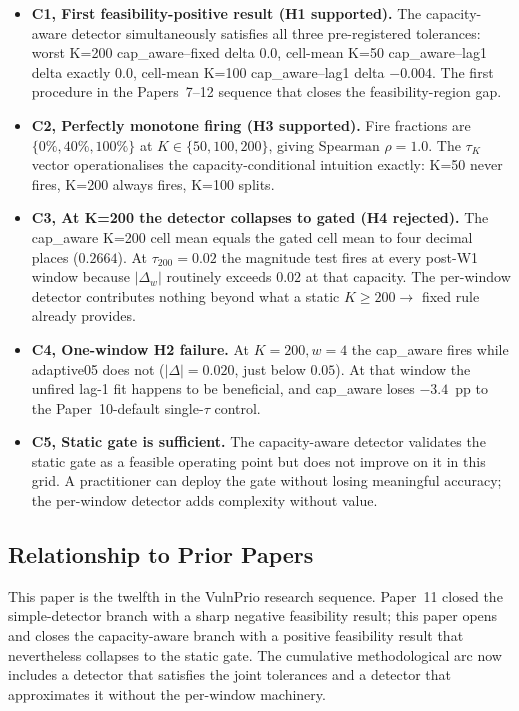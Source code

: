 \begin{itemize}
\item \textbf{C1, First feasibility-positive result (H1 supported).}
The capacity-aware detector simultaneously satisfies all three
pre-registered tolerances: worst K=200 cap\_aware--fixed delta $0.0$,
cell-mean K=50 cap\_aware--lag1 delta exactly $0.0$, cell-mean K=100
cap\_aware--lag1 delta $-0.004$. The first procedure in the
Papers~7--12 sequence that closes the feasibility-region gap.

\item \textbf{C2, Perfectly monotone firing (H3 supported).} Fire
fractions are $\{0\%, 40\%, 100\%\}$ at $K \in \{50, 100, 200\}$,
giving Spearman $\rho = 1.0$. The $\tau_K$ vector operationalises
the capacity-conditional intuition exactly: K=50 never fires, K=200
always fires, K=100 splits.

\item \textbf{C3, At K=200 the detector collapses to gated (H4
rejected).} The cap\_aware K=200 cell mean equals the gated cell mean
to four decimal places ($0.2664$). At $\tau_{200} = 0.02$ the
magnitude test fires at every post-W1 window because $|\Delta_w|$
routinely exceeds $0.02$ at that capacity. The per-window detector
contributes nothing beyond what a static $K \geq 200 \to$ fixed rule
already provides.

\item \textbf{C4, One-window H2 failure.} At $K=200, w=4$ the
cap\_aware fires while adaptive05 does not ($|\Delta| = 0.020$, just
below $0.05$). At that window the unfired lag-1 fit happens to be
beneficial, and cap\_aware loses $-3.4$~pp to the Paper~10-default
single-$\tau$ control.

\item \textbf{C5, Static gate is sufficient.} The capacity-aware
detector validates the static gate as a feasible operating point but
does not improve on it in this grid. A practitioner can deploy the
gate without losing meaningful accuracy; the per-window detector
adds complexity without value.
\end{itemize}

\subsection{Relationship to Prior Papers}

This paper is the twelfth in the VulnPrio research sequence. Paper~11
closed the simple-detector branch with a sharp negative feasibility
result; this paper opens and closes the capacity-aware branch with
a positive feasibility result that nevertheless collapses to the
static gate. The cumulative methodological arc now includes a
detector that satisfies the joint tolerances and a detector that
approximates it without the per-window machinery.

